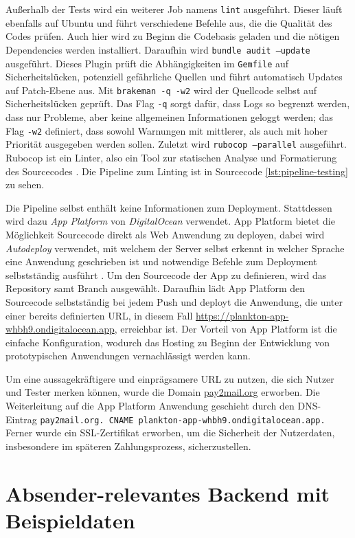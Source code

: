 \noindent Außerhalb der Tests wird ein weiterer Job namens \texttt{lint} ausgeführt. Dieser läuft ebenfalls auf Ubuntu und führt verschiedene Befehle aus, die die Qualität des Codes prüfen. Auch hier wird zu Beginn die Codebasis geladen und die nötigen Dependencies werden installiert. Daraufhin wird \texttt{bundle audit --update} ausgeführt. Dieses Plugin prüft die Abhängigkeiten im \texttt{Gemfile} auf Sicherheitslücken, potenziell gefährliche Quellen und führt automatisch Updates auf Patch-Ebene aus. Mit \texttt{brakeman -q -w2} wird der Quellcode selbst auf Sicherheitslücken geprüft. Das Flag \texttt{-q} sorgt dafür, dass Logs so begrenzt werden, dass nur Probleme, aber keine allgemeinen Informationen geloggt werden; das Flag \texttt{-w2} definiert, dass sowohl Warnungen mit mittlerer, als auch mit hoher Priorität ausgegeben werden sollen. Zuletzt wird \texttt{rubocop --parallel} ausgeführt. Rubocop ist ein Linter, also ein Tool zur statischen Analyse und Formatierung des Sourcecodes \citep{Batsov2022}. Die Pipeline zum Linting ist in Sourcecode \ref{lst:pipeline-testing} zu sehen.

Die Pipeline selbst enthält keine Informationen zum Deployment. Stattdessen wird dazu \textit{App Platform} von \textit{DigitalOcean} verwendet. App Platform bietet die Möglichkeit Sourcecode direkt als Web Anwendung zu deployen, dabei wird \textit{Autodeploy} verwendet, mit welchem der Server selbst erkennt in welcher Sprache eine Anwendung geschrieben ist und notwendige Befehle zum Deployment selbstständig ausführt \citep{DigitalOcean2022}. Um den Sourcecode der App zu definieren, wird das Repository samt Branch ausgewählt. Daraufhin lädt App Platform den Sourcecode selbstständig bei jedem Push und deployt die Anwendung, die unter einer bereits definierten URL, in diesem Fall \url{https://plankton-app-whbh9.ondigitalocean.app}, erreichbar ist. Der Vorteil von App Platform ist die einfache Konfiguration, wodurch das Hosting zu Beginn der Entwicklung von prototypischen Anwendungen vernachlässigt werden kann.

Um eine aussagekräftigere und einprägsamere URL zu nutzen, die sich Nutzer und Tester merken können, wurde die Domain \url{pay2mail.org} erworben. Die Weiterleitung auf die App Platform Anwendung geschieht durch den DNS-Eintrag \texttt{pay2mail.org. CNAME plankton-app-whbh9.ondigitalocean.app.} Ferner wurde ein SSL-Zertifikat erworben, um die Sicherheit der Nutzerdaten, insbesondere im späteren Zahlungsprozess, sicherzustellen.

\section{Absender-relevantes Backend mit Beispieldaten}
\label{Absender-relevantes_Backend_mit_Beispieldaten}

